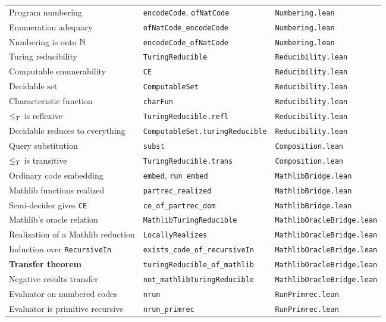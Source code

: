 \begin{table}[h]
\begin{tabular}{lll}
Program numbering & \texttt{encodeCode}, \texttt{ofNatCode} & \texttt{Numbering.lean} \\
Enumeration adequacy & \texttt{ofNatCode\_encodeCode} & \texttt{Numbering.lean} \\
Numbering is onto $\mathbb{N}$ & \texttt{encodeCode\_ofNatCode} & \texttt{Numbering.lean} \\
Turing reducibility & \texttt{TuringReducible} & \texttt{Reducibility.lean} \\
Computable enumerability & \texttt{CE} & \texttt{Reducibility.lean} \\
Decidable set & \texttt{ComputableSet} & \texttt{Reducibility.lean} \\
Characteristic function & \texttt{charFun} & \texttt{Reducibility.lean} \\
$\leq_T$ is reflexive & \texttt{TuringReducible.refl} & \texttt{Reducibility.lean} \\
Decidable reduces to everything & \texttt{ComputableSet.turingReducible} & \texttt{Reducibility.lean} \\
Query substitution & \texttt{subst} & \texttt{Composition.lean} \\
$\leq_T$ is transitive & \texttt{TuringReducible.trans} & \texttt{Composition.lean} \\
Ordinary code embedding & \texttt{embed}, \texttt{run\_embed} & \texttt{MathlibBridge.lean} \\
Mathlib functions realized & \texttt{partrec\_realized} & \texttt{MathlibBridge.lean} \\
Semi-decider gives \texttt{CE} & \texttt{ce\_of\_partrec\_dom} & \texttt{MathlibBridge.lean} \\
Mathlib's oracle relation & \texttt{MathlibTuringReducible} & \texttt{MathlibOracleBridge.lean} \\
Realization of a Mathlib reduction & \texttt{LocallyRealizes} & \texttt{MathlibOracleBridge.lean} \\
Induction over \texttt{RecursiveIn} & \texttt{exists\_code\_of\_recursiveIn} & \texttt{MathlibOracleBridge.lean} \\
\textbf{Transfer theorem} & \texttt{turingReducible\_of\_mathlib} & \texttt{MathlibOracleBridge.lean} \\
Negative results transfer & \texttt{not\_mathlibTuringReducible} & \texttt{MathlibOracleBridge.lean} \\
Evaluator on numbered codes & \texttt{nrun} & \texttt{RunPrimrec.lean} \\
Evaluator is primitive recursive & \texttt{nrun\_primrec} & \texttt{RunPrimrec.lean} \\

\end{tabular}
\end{table}
